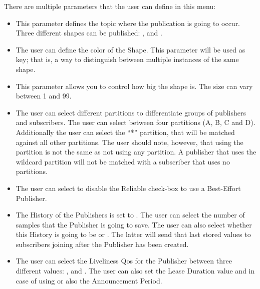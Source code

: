 \documentclass[letterpaper,10pt,english]{sphinxmanual}
\begin{document}

There are multiple parameters that the user can define in this menu:
\begin{itemize}
\item {} 
 This parameter defines the topic where the publication is going to occur. Three different shapes can be published: ,  and .

\item {} 
 The user can define the color of the Shape. This parameter will be used as key; that is, a way to distinguish between multiple instances of the same shape.

\item {} 
 This parameter allows you to control how big the shape is. The size can vary between 1 and 99.

\item {} 
 The user can select different partitions to differentiate groups of publishers and subscribers. The user can select between four partitions (A, B, C and D). Additionally the user can select the “*” partition, that will be matched against all other partitions. The user should note, however, that using the  partition is not the same as not using any partition. A publisher that uses the wildcard partition will not be matched with a subscriber that uses no partitions.

\item {} 
 The user can select to disable the Reliable check-box to use a Best-Effort Publisher.

\item {} 
 The History of the Publishers is set to . The user can select the number of samples that the Publisher is going to save. The user can also select whether this History is going to be  or . The latter will send that last stored values to subscribers joining after the Publisher has been created.

\item {} 
 The user can select the Liveliness Qos for the Publisher between three different values: ,  and . The user can also set the Lease Duration value and in case of using  or  also the Announcement Period.


\end{itemize}
\end{document}
